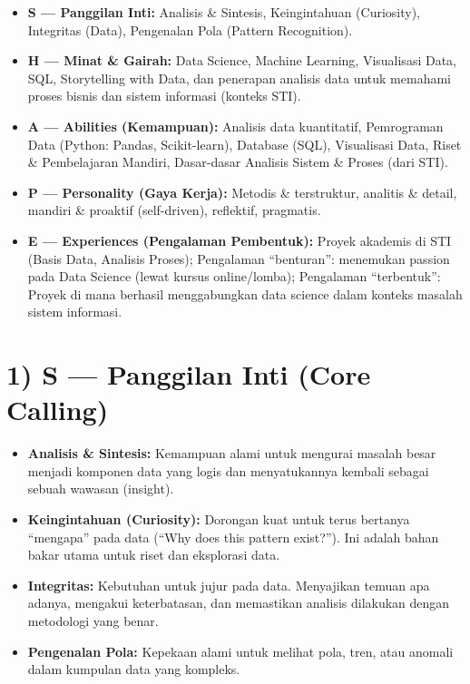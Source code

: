 \documentclass[
  letterpaper,
  DIV=11,
  numbers=noendperiod]{scrreprt}
\providecommand{\tightlist}{%
  \setlength{\itemsep}{0pt}\setlength{\parskip}{0pt}}
\begin{document}
\begin{itemize}
\tightlist
\item
  \textbf{S --- Panggilan Inti:} Analisis \& Sintesis, Keingintahuan
  (Curiosity), Integritas (Data), Pengenalan Pola (Pattern Recognition).
\item
  \textbf{H --- Minat \& Gairah:} Data Science, Machine Learning,
  Visualisasi Data, SQL, Storytelling with Data, dan penerapan analisis
  data untuk memahami proses bisnis dan sistem informasi (konteks STI).
\item
  \textbf{A --- Abilities (Kemampuan):} Analisis data kuantitatif,
  Pemrograman Data (Python: Pandas, Scikit-learn), Database (SQL),
  Visualisasi Data, Riset \& Pembelajaran Mandiri, Dasar-dasar Analisis
  Sistem \& Proses (dari STI).
\item
  \textbf{P --- Personality (Gaya Kerja):} Metodis \& terstruktur,
  analitis \& detail, mandiri \& proaktif (self-driven), reflektif,
  pragmatis.
\item
  \textbf{E --- Experiences (Pengalaman Pembentuk):} Proyek akademis di
  STI (Basis Data, Analisis Proses); Pengalaman ``benturan'': menemukan
  passion pada Data Science (lewat kursus online/lomba); Pengalaman
  ``terbentuk'': Proyek di mana berhasil menggabungkan data science
  dalam konteks masalah sistem informasi.
\end{itemize}

\section{1) S --- Panggilan Inti (Core
Calling)}\label{s-panggilan-inti-core-calling}

\begin{itemize}
\tightlist
\item
  \textbf{Analisis \& Sintesis:} Kemampuan alami untuk mengurai masalah
  besar menjadi komponen data yang logis dan menyatukannya kembali
  sebagai sebuah wawasan (insight).
\item
  \textbf{Keingintahuan (Curiosity):} Dorongan kuat untuk terus bertanya
  ``mengapa'' pada data (``Why does this pattern exist?''). Ini adalah
  bahan bakar utama untuk riset dan eksplorasi data.
\item
  \textbf{Integritas:} Kebutuhan untuk jujur pada data. Menyajikan
  temuan apa adanya, mengakui keterbatasan, dan memastikan analisis
  dilakukan dengan metodologi yang benar.
\item
  \textbf{Pengenalan Pola:} Kepekaan alami untuk melihat pola, tren,
  atau anomali dalam kumpulan data yang kompleks.
\end{itemize}
\end{document}
